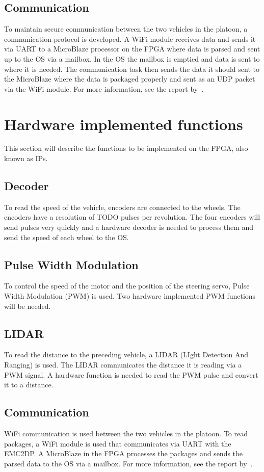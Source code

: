 \subsection{Communication}
To maintain secure communication between the two vehicles in the platoon, a communication protocol is developed. A WiFi module receives data and sends it via UART to a MicroBlaze processor on the FPGA where data is parsed and sent up to the OS via a mailbox. In the OS the mailbox is emptied and data is sent to where it is needed. The communication task then sends the data it should sent to the MicroBlaze where the data is packaged properly and sent as an UDP packet via the WiFi module. For more information, see the report by~\cite{lerander2017}.

\section{Hardware implemented functions}
This section will describe the functions to be implemented on the FPGA, also known as IPs.

\subsection{Decoder}
To read the speed of the vehicle, encoders are connected to the wheels. The encoders have a resolution of TODO pulses per revolution. The four encoders will send pulses very quickly and a hardware decoder is needed to process them and send the speed of each wheel to the OS.

\subsection{Pulse Width Modulation}
To control the speed of the motor and the position of the steering servo, Pulse Width Modulation (PWM) is used. Two hardware implemented PWM functions will be needed.

\subsection{LIDAR}
To read the distance to the preceding vehicle, a LIDAR (LIght Detection And Ranging) is used. The LIDAR communicates the distance it is reading via a PWM signal. A hardware function is needed to read the PWM pulse and convert it to a distance.

\subsection{Communication}
WiFi communication is used between the two vehicles in the platoon. To read packages, a WiFi module is used that communicates via UART with the EMC2DP. A MicroBlaze in the FPGA processes the packages and sends the parsed data to the OS via a mailbox. For more information, see the report by~\cite{lerander2017}.

